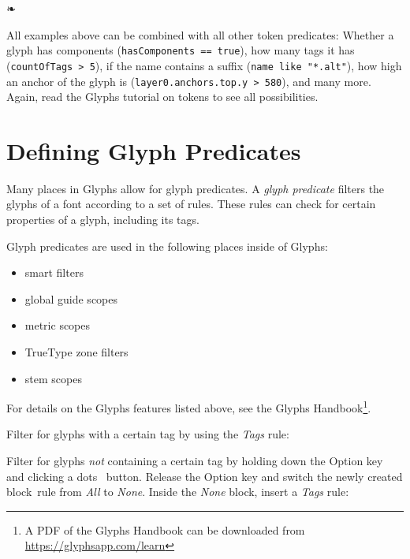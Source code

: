\begin{center}
  ❧
\end{center}

\noindent All examples above can be combined with all other token predicates:
Whether a glyph has components (\texttt{hasComponents == true}),
how many tags it has (\texttt{countOfTags > 5}),
if the name contains a suffix (\texttt{name like "*.alt"}),
how high an anchor of the glyph is (\texttt{layer0.anchors.top.y > 580}),
and many more.
Again, read the Glyphs tutorial on tokens to see all possibilities.

\section{Defining Glyph Predicates}%
\label{sec:defining-glyph-predicates}

Many places in Glyphs allow for glyph predicates.
A \emph{glyph predicate} filters the glyphs of a font according to a set of rules.
These rules can check for certain properties of a glyph, including its tags.

\medbreak\noindent Glyph predicates are used in the following places inside of Glyphs:

\begin{itemize}
  \item
    smart filters
  
  \item
    global guide scopes
  
  \item
    metric scopes
  
  \item
    TrueType zone filters
  
  \item
    stem scopes
\end{itemize}

\noindent For details on the Glyphs features listed above, see the Glyphs Handbook\footnote{A PDF of the Glyphs Handbook can be downloaded from \url{https://glyphsapp.com/learn}}.

\medbreak\noindent Filter for glyphs with a certain tag by using the \emph{Tags} rule:

\medbreak\noindent{}

\medbreak\noindent Filter for glyphs \emph{not} containing a certain tag by holding down the Option key and clicking a dots~ button.
Release the Option key and switch the newly created block~rule from \emph{All} to \emph{None}.
Inside the \emph{None} block, insert a \emph{Tags} rule:


